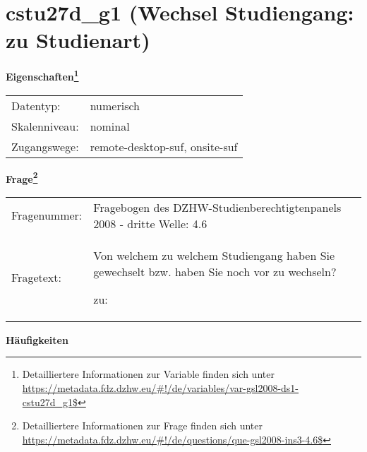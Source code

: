 
    \setcounter{footnote}{0}

    \vspace*{-1.8cm}
	\section{cstu27d\_g1 (Wechsel Studiengang: zu Studienart)}
	\label{section:cstu27d_g1}



    \vspace*{0.5cm}
    \noindent\textbf{Eigenschaften\footnote{Detailliertere Informationen zur Variable finden sich unter
		\url{https://metadata.fdz.dzhw.eu/\#!/de/variables/var-gsl2008-ds1-cstu27d_g1$}}}\\
	\begin{tabularx}{\hsize}{@{}lX}
	Datentyp: & numerisch \\
	Skalenniveau: & nominal \\
	Zugangswege: &
	  remote-desktop-suf, 
	  onsite-suf
 \\
    \end{tabularx}



				\vspace*{0.5cm}
                \noindent\textbf{Frage\footnote{Detailliertere Informationen zur Frage finden sich unter
		              \url{https://metadata.fdz.dzhw.eu/\#!/de/questions/que-gsl2008-ins3-4.6$}}}\\
				\begin{tabularx}{\hsize}{@{}lX}
					Fragenummer: &
					  Fragebogen des DZHW-Studienberechtigtenpanels 2008 - dritte Welle:
					  4.6
 \\
					Fragetext: & Von welchem zu welchem Studiengang haben Sie gewechselt bzw. haben Sie noch vor zu wechseln?\par  zu: \\
				\end{tabularx}





        		\vspace*{0.5cm}
                \noindent\textbf{Häufigkeiten}

